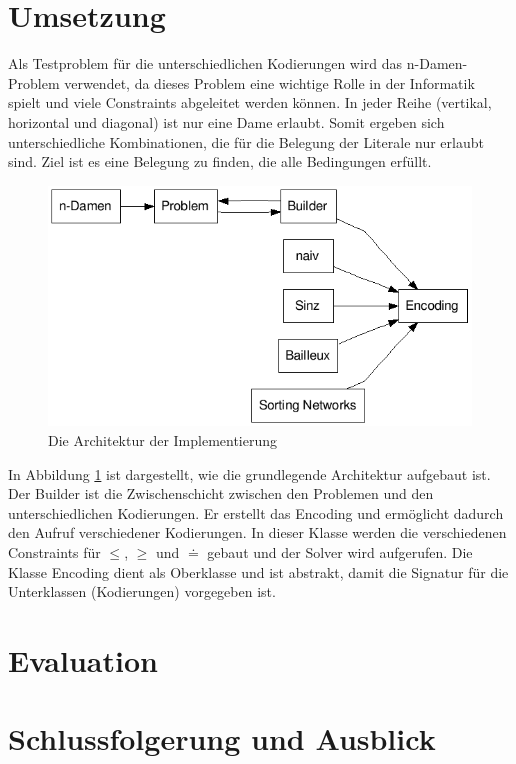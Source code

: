 \documentclass[a4,abstract=on]{scrartcl}
\newcommand*\stdsection{}
\let\stdsection\section
\renewcommand*\section{%
    \clearpage\ifodd\value{page}\else\mbox{}\clearpage\fi
    \stdsection}
\begin{document}
\section{Umsetzung}
 Als Testproblem für die unterschiedlichen Kodierungen wird das n-Damen-Problem verwendet, da dieses Problem eine wichtige Rolle in der Informatik spielt und viele Constraints abgeleitet werden können. In jeder Reihe (vertikal, horizontal und diagonal) ist nur eine Dame erlaubt. Somit ergeben sich unterschiedliche Kombinationen, die für die Belegung der Literale nur erlaubt sind. Ziel ist es eine Belegung zu finden, die alle Bedingungen erfüllt. 

\begin{figure}[H]
\centering
\includegraphics[width=\textwidth]{architektur.png}
\caption{Die Architektur der Implementierung}
\label{fig:architektur}
\end{figure}

In Abbildung \ref{fig:architektur} ist dargestellt, wie die grundlegende Architektur aufgebaut ist. 
Der Builder ist die Zwischenschicht zwischen den Problemen und den unterschiedlichen Kodierungen. Er erstellt das Encoding und ermöglicht dadurch den Aufruf verschiedener Kodierungen. In dieser Klasse werden die verschiedenen Constraints für $\leq$, 	$\geq$ und $\doteq$ gebaut und der Solver wird aufgerufen. Die Klasse Encoding dient als Oberklasse und ist abstrakt, damit die Signatur für die Unterklassen (Kodierungen) vorgegeben ist. 

\section{Evaluation}

\section{Schlussfolgerung und Ausblick}
\end{document}
